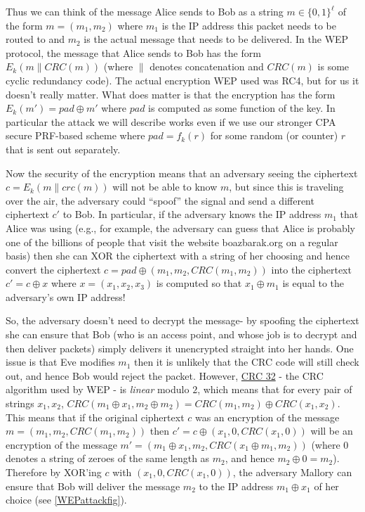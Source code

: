 Thus we can think of the message Alice sends to Bob as a string
\(m\in\{0,1\}^\ell\) of the form \(m=(m_1,m_2)\) where \(m_1\) is the IP
address this packet needs to be routed to and \(m_2\) is the actual
message that needs to be delivered. In the WEP protocol, the message
that Alice sends to Bob has the form\\
\(E_k(m\|\ensuremath{\mathit{CRC}}(m))\) (where \(\|\) denotes
concatenation and \(\ensuremath{\mathit{CRC}}(m)\) is some cyclic
redundancy code). The actual encryption WEP used was RC4, but for us it
doesn't really matter. What does matter is that the encryption has the
form \(E_k(m') = pad \oplus m'\) where \(pad\) is computed as some
function of the key. In particular the attack we will describe works
even if we use our stronger CPA secure PRF-based scheme where
\(pad=f_k(r)\) for some random (or counter) \(r\) that is sent out
separately.

Now the security of the encryption means that an adversary seeing the
ciphertext \(c=E_k(m\|crc(m))\) will not be able to know \(m\), but
since this is traveling over the air, the adversary could ``spoof'' the
signal and send a different ciphertext \(c'\) to Bob. In particular, if
the adversary knows the IP address \(m_1\) that Alice was using (e.g.,
for example, the adversary can guess that Alice is probably one of the
billions of people that visit the website boazbarak.org on a regular
basis) then she can XOR the ciphertext with a string of her choosing and
hence convert the ciphertext
\(c = pad \oplus (m_1,m_2,\ensuremath{\mathit{CRC}}(m_1,m_2))\) into the
ciphertext \(c' = c \oplus x\) where \(x=(x_1,x_2,x_3)\) is computed so
that \(x_1 \oplus m_1\) is equal to the adversary's own IP address!

So, the adversary doesn't need to decrypt the message- by spoofing the
ciphertext she can ensure that Bob (who is an access point, and whose
job is to decrypt and then deliver packets) simply delivers it
unencrypted straight into her hands. One issue is that Eve modifies
\(m_1\) then it is unlikely that the CRC code will still check out, and
hence Bob would reject the packet. However,
\href{https://goo.gl/5aqEHB}{CRC 32} - the CRC algorithm used by WEP -
is \emph{linear} modulo \(2\), which means that for every pair of
strings \(x_1,x_2\),
\(\ensuremath{\mathit{CRC}}(m_1\oplus x_1,m_2 \oplus m_2)=\ensuremath{\mathit{CRC}}(m_1,m_2)\oplus \ensuremath{\mathit{CRC}}(x_1,x_2)\).
This means that if the original ciphertext \(c\) was an encryption of
the message \(m=(m_1,m_2,\ensuremath{\mathit{CRC}}(m_1,m_2))\) then
\(c'=c \oplus (x_1,0,\ensuremath{\mathit{CRC}}(x_1,0))\) will be an
encryption of the message
\(m'=(m_1 \oplus x_1, m_2, \ensuremath{\mathit{CRC}}(x_1\oplus m_1,m_2))\)
(where \(0\) denotes a string of zeroes of the same length as \(m_2\),
and hence \(m_2 \oplus 0 = m_2\)). Therefore by XOR'ing \(c\) with
\((x_1,0,\ensuremath{\mathit{CRC}}(x_1,0))\), the adversary Mallory can
ensure that Bob will deliver the message \(m_2\) to the IP address
\(m_1 \oplus x_1\) of her choice (see \cref{WEPattackfig}).


